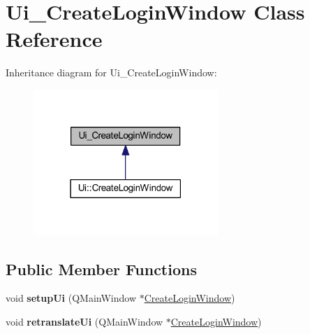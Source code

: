 \hypertarget{class_ui___create_login_window}{}\section{Ui\+\_\+\+Create\+Login\+Window Class Reference}
\label{class_ui___create_login_window}


Inheritance diagram for Ui\+\_\+\+Create\+Login\+Window\+:
\nopagebreak
\begin{figure}[H]
\begin{center}
\leavevmode
\includegraphics[width=198pt]{class_ui___create_login_window__inherit__graph}
\end{center}
\end{figure}
\subsection*{Public Member Functions}
\begin{DoxyCompactItemize}
\item 
\mbox{\label{class_ui___create_login_window_a779c4dd1f120bc0f1e29699a9360ba1e}} 
void {\bfseries setup\+Ui} (Q\+Main\+Window $\ast$\hyperlink{class_create_login_window}{Create\+Login\+Window})
\item 
\mbox{\label{class_ui___create_login_window_a173733b8670b52a11c09c9d881448d3f}} 
void {\bfseries retranslate\+Ui} (Q\+Main\+Window $\ast$\hyperlink{class_create_login_window}{Create\+Login\+Window})
\end{DoxyCompactItemize}
